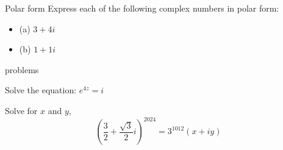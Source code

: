 \documentclass[11pt]{beamer}
\theoremstyle{plain}
\begin{document}
\begin{frame}{Polar form}
    Express each of the following complex numbers in polar form:
    \begin{itemize}
        \item (a) $3+4i$
        \item (b) $1+1i$
    \end{itemize}
\end{frame}

\begin{frame}{problems}
    \begin{problem}
        Solve the equation: $e^{4z}=i$
    \end{problem}
    \begin{problem}
        Solve for $x$ and $y$,
        $$
        \left(\frac{3}{2}+\frac{\sqrt 3}{2}i\right)^{2024}=3^{1012}(x+iy)
        $$
    \end{problem}
\end{frame}
\end{document}
